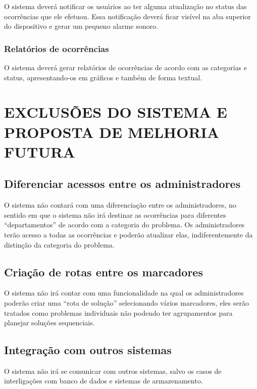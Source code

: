 O sistema deverá notificar os usuários ao ter alguma atualização no status das ocorrências que ele efetuou. Essa notificação deverá ficar visível na aba superior do dispositivo e gerar um pequeno alarme sonoro.

\subsubsection{Relatórios de ocorrências}

O sistema deverá gerar relatórios de ocorrências de acordo com as categorias e status, apresentando-os em gráficos e também de forma textual.

\section{EXCLUSÕES DO SISTEMA E PROPOSTA DE MELHORIA FUTURA}


\subsection{Diferenciar acessos entre os administradores}

O sistema não contará com uma diferenciação entre os administradores, no sentido em que o sistema não irá destinar as ocorrências para diferentes “departamentos” de acordo com a categoria do problema. Os administradores terão acesso a todas as ocorrências e poderão atualizar elas, indiferentemente da distinção da categoria do problema. 

\subsection{Criação de rotas entre os marcadores}

O sistema não irá contar com uma funcionalidade na qual os administradores poderão criar uma “rota de solução” selecionando vários marcadores, eles serão tratados como problemas individuais não podendo ter agrupamentos para planejar soluções sequenciais.

\subsection{Integração com outros sistemas }

O sistema não irá se comunicar com outros sistemas, salvo os casos de interligações com banco de dados e sistemas de armazenamento.



